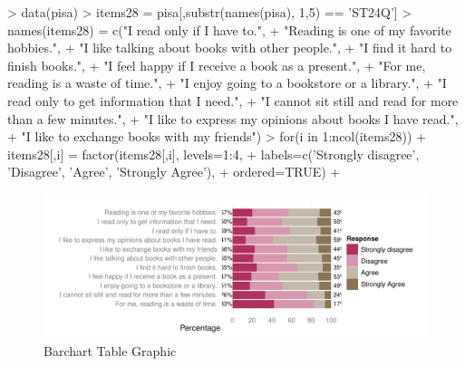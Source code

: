 \documentclass[letterpaper,11pt]{article}
\begin{document}
\begin{Schunk}
\begin{Sinput}
> data(pisa)
> items28 = pisa[,substr(names(pisa), 1,5) == 'ST24Q']
> names(items28) = c("I read only if I have to.",
+    "Reading is one of my favorite hobbies.",
+    "I like talking about books with other people.",
+    "I find it hard to finish books.",
+    "I feel happy if I receive a book as a present.",
+    "For me, reading is a waste of time.",
+    "I enjoy going to a bookstore or a library.",
+    "I read only to get information that I need.",
+    "I cannot sit still and read for more than a few minutes.",
+    "I like to express my opinions about books I have read.",
+    "I like to exchange books with my friends")
> for(i in 1:ncol(items28)) {
+ 	items28[,i] = factor(items28[,i], levels=1:4, 
+ 		labels=c('Strongly disagree', 'Disagree', 'Agree', 'Strongly Agree'),
+ 		ordered=TRUE)
+ }
\end{Sinput}
\end{Schunk}

\begin{figure}
\begin{center}
\includegraphics{irutils-PISAItem28BarchartTable1}
\caption{Barchart Table Graphic}
\label{fig:PISAItem28BarchartTable1}
\end{center}
\end{figure}
\end{document}
